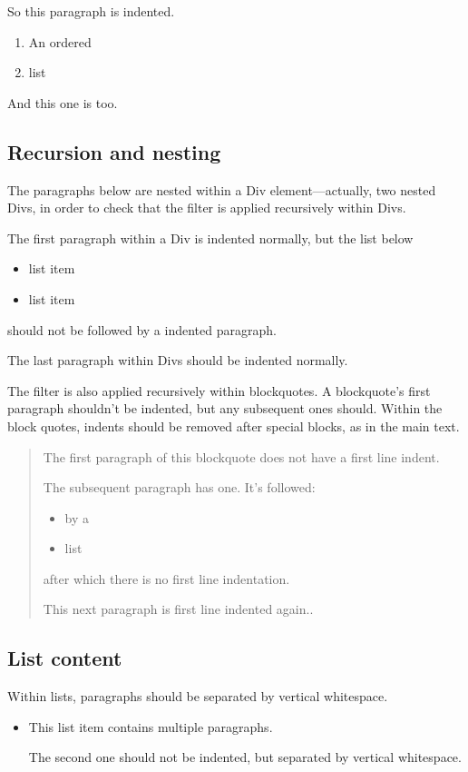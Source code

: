 So this paragraph is indented.

\begin{enumerate}
\def\labelenumi{\arabic{enumi}.}
\tightlist
\item
  An ordered
\item
  list
\end{enumerate}

And this one is too.

\subsection{Recursion and nesting}\label{recursion-and-nesting}

The paragraphs below are nested within a Div element---actually, two
nested Divs, in order to check that the filter is applied recursively
within Divs.

\protect{}\label{div}
\protect{}\label{subdiv}
The first paragraph within a Div is indented normally, but the list
below

\begin{itemize}
\tightlist
\item
  list item
\item
  list item
\end{itemize}

\noindent should not be followed by a indented paragraph.

The last paragraph within Divs should be indented normally.

The filter is also applied recursively within blockquotes. A
blockquote's first paragraph shouldn't be indented, but any subsequent
ones should. Within the block quotes, indents should be removed after
special blocks, as in the main text.

\begin{quote}
\noindent The first paragraph of this blockquote does not have a first
line indent.

The subsequent paragraph has one. It's followed:

\begin{itemize}
\tightlist
\item
  by a
\item
  list
\end{itemize}

\noindent after which there is no first line indentation.

This next paragraph is first line indented again..
\end{quote}

\subsection{List content}\label{list-content}

Within lists, paragraphs should be separated by vertical whitespace.

\begin{itemize}
\item
  This list item contains multiple paragraphs.

  The second one should not be indented, but separated by vertical
  whitespace.
\end{itemize}
